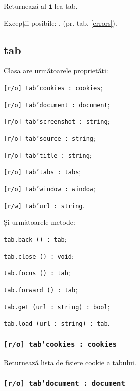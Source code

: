 Returnează al \texttt{i}-lea tab.

Excepții posibile: ,  (pr. tab. \ref{errors}).

\subsection{tab}

Clasa \tab{} are următoarele proprietăți:
\begin{icItems}
	\item \texttt{[r/o] tab'cookies : cookies};
	\item \texttt{[r/o] tab'document : document};
	\item \texttt{[r/o] tab'screenshot : string};
	\item \texttt{[r/o] tab'source : string};
	\item \texttt{[r/o] tab'title : string};
	\item \texttt{[r/o] tab'tabs : tabs};
	\item \texttt{[r/o] tab'window : window};
	\item \texttt{[r/w] tab'url : string}.
\end{icItems}

Și următoarele metode:
\begin{icItems}
	\item \texttt{tab.back () : tab};
	\item \texttt{tab.close () : void};
	\item \texttt{tab.focus () : tab};
	\item \texttt{tab.forward () : tab};
	\item \texttt{tab.get (url : string) : bool};
	\item \texttt{tab.load (url : string) : tab}.
\end{icItems}

\subsubsection{\texttt{[r/o] tab'cookies : cookies}}

Returnează lista de fișiere cookie a tabului.

\subsubsection{\texttt{[r/o] tab'document : document}}


